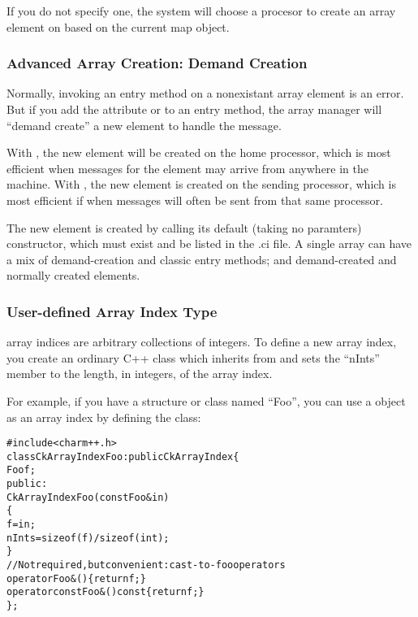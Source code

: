 If you do not specify one, the system will choose a procesor to 
create an array element on based on the current map object.



\subsubsection{Advanced Array Creation: Demand Creation}

Normally, invoking an entry method on a nonexistant array
element is an error.  But if you add the attribute
 
\kw{[createhere]} or \kw{[createhome]} to an entry method,
 the array manager will 
``demand create'' a new element to handle the message.  

With \kw{[createhome]}, the new element
will be created on the home processor, which is most efficient when messages for
the element may arrive from anywhere in the machine. With \kw{[createhere]},
the new element is created on the sending processor, which is most efficient
if when messages will often be sent from that same processor.

The new element is created by calling its default (taking no
paramters) constructor, which must exist and be listed in the .ci file.
A single array can have a mix of demand-creation and
classic entry methods; and demand-created and normally 
created elements.



\subsubsection{User-defined Array Index Type}
\label{user-defined array index type}

\charmpp{} array indices are arbitrary collections of integers.
To define a new array index, you create an ordinary C++ class 
which inherits from  and sets the ``nInts'' member
to the length, in integers, of the array index.

For example, if you have a structure or class named ``Foo'', you 
can use a  object as an array index by defining the class:

\begin{alltt}
#include <charm++.h>
class CkArrayIndexFoo:public CkArrayIndex \{
    Foo f;
public:
    CkArrayIndexFoo(const Foo \&in) 
    \{
        f=in;
        nInts=sizeof(f)/sizeof(int);
    \}
    //Not required, but convenient: cast-to-foo operators
    operator Foo &() \{return f;\}
    operator const Foo &() const \{return f;\}
\};
\end{alltt}

